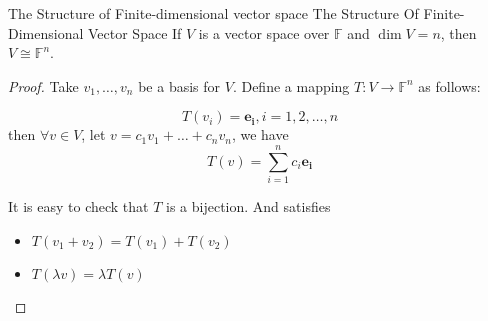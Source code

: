 \documentclass[../main.tex]{subfiles}
\begin{document}
\begin{theorem}{The Structure of Finite-dimensional vector space }{The Structure Of Finite-Dimensional Vector Space }
If $V$ is a vector space over $\mathbb{F}$ and $\dim V=n$, then $V \cong \mathbb{F}^n$.
\end{theorem}

\begin{proof}
Take $v_1, \ldots ,v_n$ be a basis for $V$. Define a mapping $T:V \rightarrow  \mathbb{F}^n$ as follows:

\begin{equation*}
T(v_i)=\boldsymbol{e_i}, i=1,2, \ldots ,n
\end{equation*}
then $\forall v \in V$, let $v=c_1v_1+\ldots +c_nv_n$, we have
\begin{equation*}
T(v) = \sum_{i=1}^{n} c_i \boldsymbol{e_i}
\end{equation*}

It is easy to check that $T$ is a bijection. And satisfies
\begin{itemize}
\item $T(v_1+v_2)= T(v_1)+T(v_2)$ 
\item $T(\lambda v) = \lambda T(v)$
\end{itemize}
\end{proof}
\end{document}
